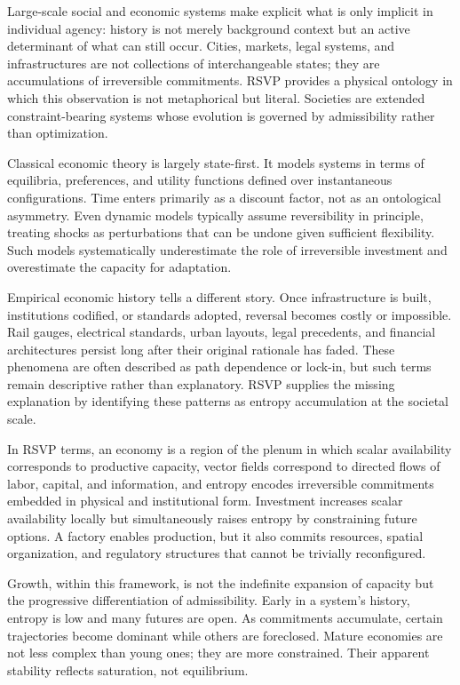 \documentclass[11pt,oneside]{book}
\begin{document}
Large-scale social and economic systems make explicit what is only implicit in individual agency: history is not merely background context but an active determinant of what can still occur. Cities, markets, legal systems, and infrastructures are not collections of interchangeable states; they are accumulations of irreversible commitments. RSVP provides a physical ontology in which this observation is not metaphorical but literal. Societies are extended constraint-bearing systems whose evolution is governed by admissibility rather than optimization.

Classical economic theory is largely state-first. It models systems in terms of equilibria, preferences, and utility functions defined over instantaneous configurations. Time enters primarily as a discount factor, not as an ontological asymmetry. Even dynamic models typically assume reversibility in principle, treating shocks as perturbations that can be undone given sufficient flexibility. Such models systematically underestimate the role of irreversible investment and overestimate the capacity for adaptation.

Empirical economic history tells a different story. Once infrastructure is built, institutions codified, or standards adopted, reversal becomes costly or impossible. Rail gauges, electrical standards, urban layouts, legal precedents, and financial architectures persist long after their original rationale has faded. These phenomena are often described as path dependence or lock-in, but such terms remain descriptive rather than explanatory. RSVP supplies the missing explanation by identifying these patterns as entropy accumulation at the societal scale.

In RSVP terms, an economy is a region of the plenum in which scalar availability corresponds to productive capacity, vector fields correspond to directed flows of labor, capital, and information, and entropy encodes irreversible commitments embedded in physical and institutional form. Investment increases scalar availability locally but simultaneously raises entropy by constraining future options. A factory enables production, but it also commits resources, spatial organization, and regulatory structures that cannot be trivially reconfigured.

Growth, within this framework, is not the indefinite expansion of capacity but the progressive differentiation of admissibility. Early in a system’s history, entropy is low and many futures are open. As commitments accumulate, certain trajectories become dominant while others are foreclosed. Mature economies are not less complex than young ones; they are more constrained. Their apparent stability reflects saturation, not equilibrium.
\end{document}
